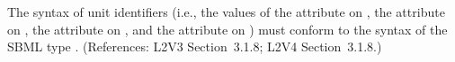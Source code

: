 The syntax of unit identifiers (i.e., the values of the 
attribute on \UnitDefinition, the  attribute on \Compartment,
the  attribute on \Parameter, and the 
attribute on \Species) must conform to the syntax of the SBML type
.  (References: L2V3 Section~3.1.8; L2V4 Section~3.1.8.)
